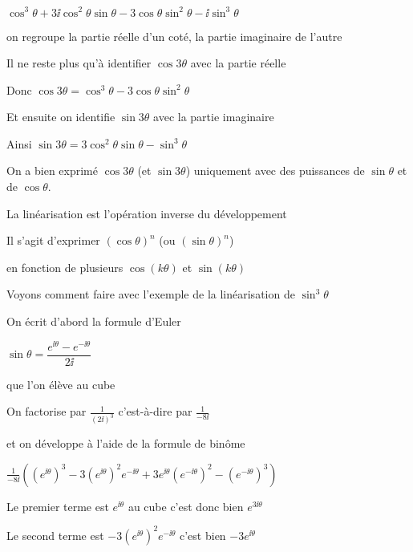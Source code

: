 $\cos^3 \theta + 3 \ii  \cos^2 \theta \sin \theta - 3 \cos \theta \sin^2
  \theta - \ii  \sin^3 \theta$

\change

on regroupe la partie réelle d'un coté, la partie imaginaire de l'autre


\change

Il ne reste plus qu'à identifier 
$\cos 3\theta$ avec la partie réelle

Donc 
 $\cos 3\theta = \cos^3 \theta - 3 \cos \theta \sin^2 \theta$

Et ensuite on identifie $\sin 3 \theta$ avec la partie imaginaire


Ainsi 
$\sin 3 \theta = 3 \cos^2 \theta \sin \theta - \sin^3 \theta$


On a bien exprimé $\cos 3\theta$ (et $\sin 3\theta$) uniquement avec des puissances
de $\sin \theta$ et de $\cos \theta$.


\diapo


La linéarisation est l'opération inverse du développement

Il s'agit d'exprimer $(\cos \theta)^n$ (ou $(\sin \theta)^n$)

en fonction de plusieurs $\cos(k\theta)$ et $\sin(k\theta)$

\change

Voyons comment faire avec l'exemple de la linéarisation de $\sin^3 \theta$

\change

On écrit d'abord la formule d'Euler

$\sin \theta = \dfrac{e^{\ii  \theta} - e^{- \ii  \theta}}{2 \ii }$

que l'on élève au cube

\change

On factorise par $\frac{1}{(2\ii)^3}$ c'est-à-dire par $\frac{1 }{-8\ii}$

et on développe à l'aide de la formule de binôme

$\frac{1}{- 8 \ii }  \left( (e^{\ii  \theta})^3 - 3 (e^{\ii  \theta})^2e^{- \ii  \theta} 
+ 3 e^{\ii  \theta}(e^{-\ii  \theta})^2 - (e^{- \ii  \theta})^3 \right)$

\change



Le premier terme est $e^{\ii  \theta}$ au cube c'est donc bien $e^{3 \ii  \theta}$

Le second terme est $-3 (e^{\ii  \theta})^2e^{- \ii  \theta} $
c'est bien $- 3 e^{\ii  \theta}$

